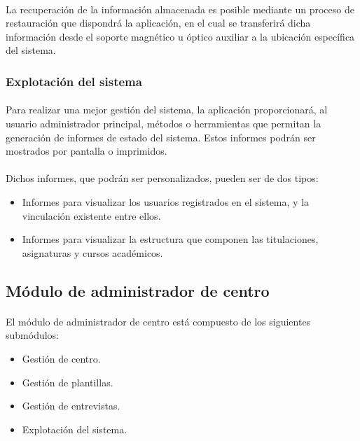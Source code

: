       \paragraph{}La recuperación de la información almacenada es posible
      mediante un proceso de restauración que dispondrá la aplicación, en el
      cual se transferirá dicha información desde el soporte magnético u
      óptico auxiliar a la ubicación específica del sistema.

      \subsubsection{Explotación del sistema}

      \paragraph{}Para realizar una mejor gestión del sistema, la aplicación
      proporcionará, al usuario administrador principal, métodos o herramientas
      que permitan la generación de informes de estado del sistema. Estos
      informes podrán ser mostrados por pantalla o imprimidos.

      \paragraph{}Dichos informes, que podrán ser personalizados, pueden ser
      de dos tipos:

      \begin{itemize}
       \item Informes para visualizar los usuarios registrados en el sistema, y
             la vinculación existente entre ellos.
       \item Informes para visualizar la estructura que componen las
             titulaciones, asignaturas y cursos académicos.
      \end{itemize}

   \subsection{Módulo de administrador de centro}

      \paragraph{}El módulo de administrador de centro está compuesto de
      los siguientes submódulos:

      \begin{itemize}
       \item Gestión de centro.
       \item Gestión de plantillas.
       \item Gestión de entrevistas.
       \item Explotación del sistema.
      \end{itemize}


